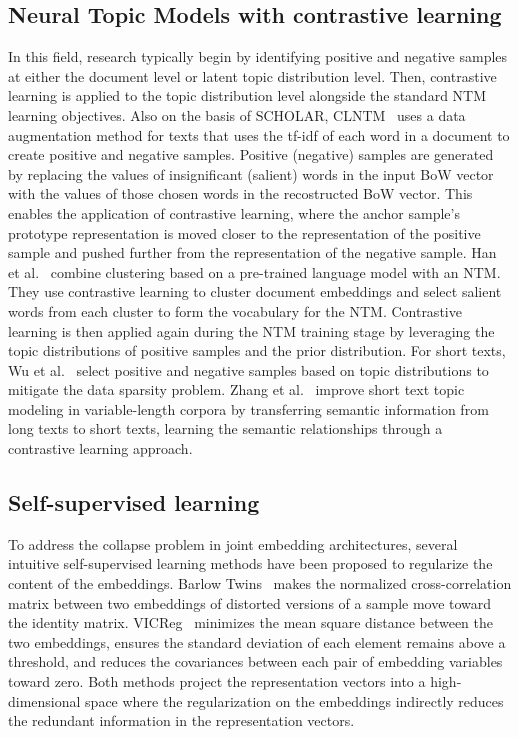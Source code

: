 \subsection{Neural Topic Models with contrastive learning}
In this field, research typically begin by identifying positive and negative samples at either the document level or latent topic distribution level. Then, contrastive learning is applied to the topic distribution level alongside the standard NTM learning objectives. 
Also on the basis of SCHOLAR, CLNTM~\cite{nguyen2021contrastive} uses a data augmentation method for texts that uses the tf-idf of each word in a document to create positive and negative samples. Positive (negative) samples are generated by replacing the values of insignificant (salient) words in the input BoW vector with the values of those chosen words in the recostructed BoW vector. This enables the application of contrastive learning, where the anchor sample's prototype representation is moved closer to the representation of the positive sample and pushed further from the representation of the negative sample.
Han et al.~\cite{han2023unified} combine clustering based on a pre-trained language model with an NTM. They use contrastive learning to cluster document embeddings and select salient words from each cluster to form the vocabulary for the NTM. Contrastive learning is then applied again during the NTM training stage by leveraging the topic distributions of positive samples and the prior distribution.
For short texts, Wu et al.~\cite{wu2022mitigating} select positive and negative samples based on topic distributions to mitigate the data sparsity problem. 
Zhang et al.~\cite{zhang2022meta} improve short text topic modeling in variable-length corpora by transferring semantic information from long texts to short texts, learning the semantic relationships through a contrastive learning approach.


\subsection{Self-supervised learning}
To address the collapse problem in joint embedding architectures, several intuitive self-supervised learning methods have been proposed to regularize the content of the embeddings.
Barlow Twins~\cite{zbontar2021barlow} makes the normalized cross-correlation matrix between two embeddings of distorted versions of a sample move toward the identity matrix.
VICReg~\cite{bardes2022vicreg} minimizes the mean square distance between the two embeddings, ensures the standard deviation of each element remains above a threshold, and reduces the covariances between each pair of embedding variables toward zero.
Both methods project the representation vectors into a high-dimensional space where the regularization on the embeddings indirectly reduces the redundant information in the representation vectors.